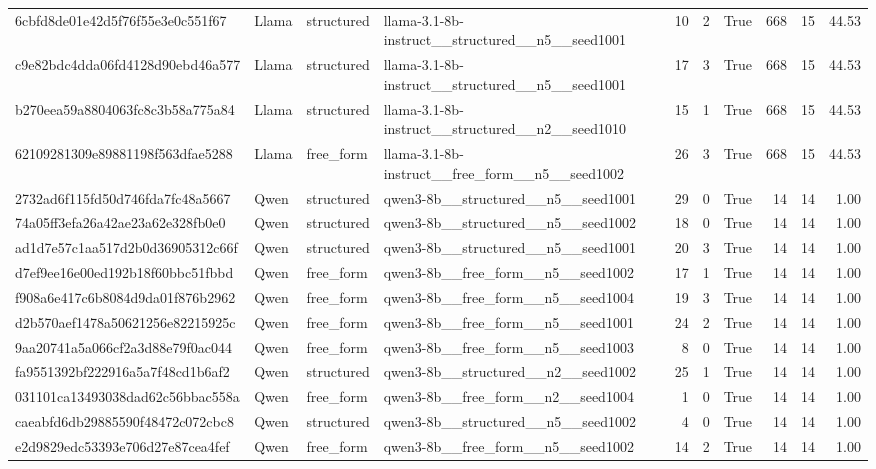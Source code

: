 \begin{longtable}{llllrrrrrr}
6cbfd8de01e42d5f76f55e3e0c551f67 & Llama & structured & llama-3.1-8b-instruct\_\_structured\_\_n5\_\_seed1001 & 10 & 2 & True & 668 & 15 & 44.53 \\
c9e82bdc4dda06fd4128d90ebd46a577 & Llama & structured & llama-3.1-8b-instruct\_\_structured\_\_n5\_\_seed1001 & 17 & 3 & True & 668 & 15 & 44.53 \\
b270eea59a8804063fc8c3b58a775a84 & Llama & structured & llama-3.1-8b-instruct\_\_structured\_\_n2\_\_seed1010 & 15 & 1 & True & 668 & 15 & 44.53 \\
62109281309e89881198f563dfae5288 & Llama & free\_form & llama-3.1-8b-instruct\_\_free\_form\_\_n5\_\_seed1002 & 26 & 3 & True & 668 & 15 & 44.53 \\
2732ad6f115fd50d746fda7fc48a5667 & Qwen & structured & qwen3-8b\_\_structured\_\_n5\_\_seed1001 & 29 & 0 & True & 14 & 14 & 1.00 \\
74a05ff3efa26a42ae23a62e328fb0e0 & Qwen & structured & qwen3-8b\_\_structured\_\_n5\_\_seed1002 & 18 & 0 & True & 14 & 14 & 1.00 \\
ad1d7e57c1aa517d2b0d36905312c66f & Qwen & structured & qwen3-8b\_\_structured\_\_n5\_\_seed1001 & 20 & 3 & True & 14 & 14 & 1.00 \\
d7ef9ee16e00ed192b18f60bbc51fbbd & Qwen & free\_form & qwen3-8b\_\_free\_form\_\_n5\_\_seed1002 & 17 & 1 & True & 14 & 14 & 1.00 \\
f908a6e417c6b8084d9da01f876b2962 & Qwen & free\_form & qwen3-8b\_\_free\_form\_\_n5\_\_seed1004 & 19 & 3 & True & 14 & 14 & 1.00 \\
d2b570aef1478a50621256e82215925c & Qwen & free\_form & qwen3-8b\_\_free\_form\_\_n5\_\_seed1001 & 24 & 2 & True & 14 & 14 & 1.00 \\
9aa20741a5a066cf2a3d88e79f0ac044 & Qwen & free\_form & qwen3-8b\_\_free\_form\_\_n5\_\_seed1003 & 8 & 0 & True & 14 & 14 & 1.00 \\
fa9551392bf222916a5a7f48cd1b6af2 & Qwen & structured & qwen3-8b\_\_structured\_\_n2\_\_seed1002 & 25 & 1 & True & 14 & 14 & 1.00 \\
031101ca13493038dad62c56bbac558a & Qwen & free\_form & qwen3-8b\_\_free\_form\_\_n2\_\_seed1004 & 1 & 0 & True & 14 & 14 & 1.00 \\
caeabfd6db29885590f48472c072cbc8 & Qwen & structured & qwen3-8b\_\_structured\_\_n5\_\_seed1002 & 4 & 0 & True & 14 & 14 & 1.00 \\
e2d9829edc53393e706d27e87cea4fef & Qwen & free\_form & qwen3-8b\_\_free\_form\_\_n5\_\_seed1002 & 14 & 2 & True & 14 & 14 & 1.00 \\

\end{longtable}
